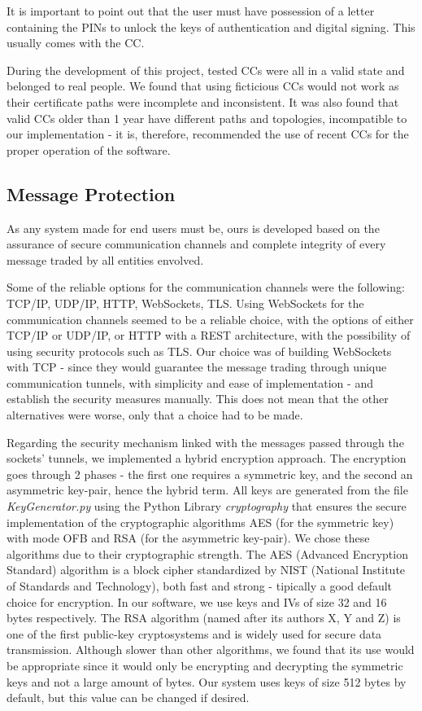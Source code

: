 \documentclass[a4paper]{article}
\begin{document}
It is important to point out that the user must have possession of a letter containing the PINs to unlock the keys of authentication and digital signing. This usually comes with the CC.

During the development of this project, tested CCs were all in a valid state and belonged to real people.
We found that using ficticious CCs would not work as their certificate paths were incomplete and inconsistent.
It was also found that valid CCs older than 1 year have different paths and topologies, incompatible to our implementation - it is, therefore, recommended the use of recent CCs for the proper operation of the software.

\subsection{Message Protection}

As any system made for end users must be, ours is developed based on the assurance of secure communication channels and complete integrity of every message traded by all entities envolved.

Some of the reliable options for the communication channels were the following: TCP/IP, UDP/IP, HTTP, WebSockets, TLS.
Using WebSockets for the communication channels seemed to be a reliable choice, with the options of either TCP/IP or UDP/IP, or HTTP with a REST architecture, with the possibility of using security protocols such as TLS.
Our choice was of building WebSockets with TCP - since they would guarantee the message trading through unique communication tunnels, with simplicity and ease of implementation - and establish the security measures manually.
This does not mean that the other alternatives were worse, only that a choice had to be made. 

Regarding the security mechanism linked with the messages passed through the sockets' tunnels, we implemented a hybrid encryption approach. 
The encryption goes through 2 phases - the first one requires a symmetric key, and the second an asymmetric key-pair, hence the hybrid term.
All keys are generated from the file \emph{KeyGenerator.py} using the Python Library \emph{cryptography} that ensures the secure implementation of the cryptographic algorithms AES (for the symmetric key) with mode OFB and RSA (for the asymmetric key-pair). 
We chose these algorithms due to their cryptographic strength. 
The AES (Advanced Encryption Standard) algorithm is a block cipher standardized by NIST (National Institute of Standards and Technology), both fast and strong - tipically a good default choice for encryption. 
In our software, we use keys and IVs of size 32 and 16 bytes respectively.
The RSA algorithm (named after its authors X, Y and Z) is one of the first public-key cryptosystems and is widely used for secure data transmission. 
Although slower than other algorithms, we found that its use would be appropriate since it would only be encrypting and decrypting the symmetric keys and not a large amount of bytes. 
Our system uses keys of size 512 bytes by default, but this value can be changed if desired.
\end{document}
